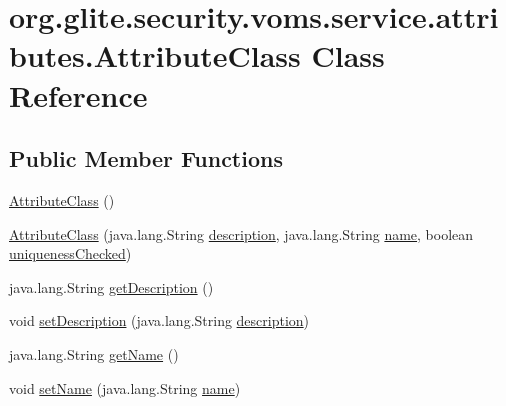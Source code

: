 \hypertarget{classorg_1_1glite_1_1security_1_1voms_1_1service_1_1attributes_1_1AttributeClass}{
\section{org.glite.security.voms.service.attributes.AttributeClass Class Reference}
\label{classorg_1_1glite_1_1security_1_1voms_1_1service_1_1attributes_1_1AttributeClass}
}
\subsection*{Public Member Functions}
\begin{DoxyCompactItemize}
\item 
\hyperlink{classorg_1_1glite_1_1security_1_1voms_1_1service_1_1attributes_1_1AttributeClass_afb9d8f4f11af60d65c68ecd4692bd98d}{AttributeClass} ()
\item 
\hyperlink{classorg_1_1glite_1_1security_1_1voms_1_1service_1_1attributes_1_1AttributeClass_a75c5da589a279ebe51e8af7dcd74499a}{AttributeClass} (java.lang.String \hyperlink{classorg_1_1glite_1_1security_1_1voms_1_1service_1_1attributes_1_1AttributeClass_a801f19a4afcc37f43430a6e4f56e8cff}{description}, java.lang.String \hyperlink{classorg_1_1glite_1_1security_1_1voms_1_1service_1_1attributes_1_1AttributeClass_a82b753e3485022060f07c71a2060d8e6}{name}, boolean \hyperlink{classorg_1_1glite_1_1security_1_1voms_1_1service_1_1attributes_1_1AttributeClass_a042045180f498b121edf4387254a6485}{uniquenessChecked})
\item 
java.lang.String \hyperlink{classorg_1_1glite_1_1security_1_1voms_1_1service_1_1attributes_1_1AttributeClass_a21f554c1bc3c04739f68a482cfc1f2ab}{getDescription} ()
\item 
void \hyperlink{classorg_1_1glite_1_1security_1_1voms_1_1service_1_1attributes_1_1AttributeClass_af7d450933af008ba36bfaceefd252db7}{setDescription} (java.lang.String \hyperlink{classorg_1_1glite_1_1security_1_1voms_1_1service_1_1attributes_1_1AttributeClass_a801f19a4afcc37f43430a6e4f56e8cff}{description})
\item 
java.lang.String \hyperlink{classorg_1_1glite_1_1security_1_1voms_1_1service_1_1attributes_1_1AttributeClass_a86aeaeb29b5ed1b15506b993cd8f4f08}{getName} ()
\item 
void \hyperlink{classorg_1_1glite_1_1security_1_1voms_1_1service_1_1attributes_1_1AttributeClass_add58c93d6eba09887305df47da475ff5}{setName} (java.lang.String \hyperlink{classorg_1_1glite_1_1security_1_1voms_1_1service_1_1attributes_1_1AttributeClass_a82b753e3485022060f07c71a2060d8e6}{name})

\end{DoxyCompactItemize}
